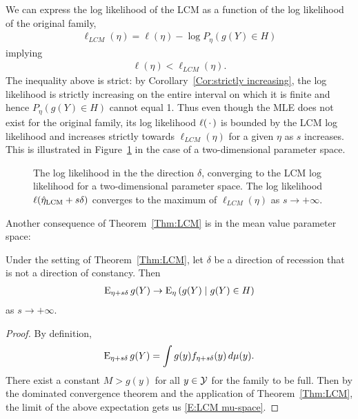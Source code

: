 We can express the log likelihood of the LCM as a function of the 
log likelihood of the original family,
\begin{align} \label{E:LCM ll bound}
 \ell_{LCM}(\eta) = \ell(\eta) - \log P_\eta(g(Y) \in H)
\end{align}
implying
\begin{align*}
	\ell(\eta) < \ell_{LCM}(\eta).	
\end{align*}
The inequality above is strict: by Corollary~\ref{Cor:strictly increasing}, the 
log likelihood is strictly increasing on the entire interval on which it is finite
and hence $P_\eta(g(Y) \in H)$ cannot equal 1.
Thus even though the MLE does not exist for the original family, its log likelihood
$\ell(\,\cdot\,)$ is bounded by the LCM log likelihood and increases strictly
towards $\ell_{LCM}(\eta)$ for a given $\eta$ as $s$ increases.
This is illustrated in Figure~\ref{F:LCM} in the case of a two-dimensional parameter
space.


\begin{figure}[h]
\centering
    \scalebox{.55}{}
	\caption[Log likelihood convergence to LCM]{The log likelihood in the
	the direction $\delta$, converging to the LCM log likelihood for a two-dimensional parameter space.  The log likelihood $\ell(\hat{\eta}_{\textrm{LCM}} + s\delta)$
	converges to the maximum of $\ell_{LCM}(\eta)$ as $s \to +\infty$.}
\label{F:LCM}
\end{figure}


Another consequence of Theorem~\ref{Thm:LCM} is in the mean value parameter space:
\begin{corollary} \label{Cor:LCM mu-space}
Under the setting of Theorem~\ref{Thm:LCM}, let $\delta$ be a direction of 
recession that is not a direction of constancy.  Then
\begin{align} \label{E:LCM mu-space}
	\operatorname{E}_{\eta+ s\delta} g(Y) \to \operatorname{E}_\eta \left ( g(Y) \mid g(Y) \in H  \right )
\end{align}
as $s \to +\infty$.
\end{corollary}
\begin{proof}
By definition,
\begin{align*}
	\operatorname{E}_{\eta+ s\delta} g(Y) = \int g(y) f_{\eta+ s\delta}(y) \, d\mu(y).
\end{align*}
There exist a constant $M > g(y)$ for all $y \in {\mathcal Y}$ for the family to
be full.  Then
by the dominated convergence theorem and the application of Theorem~\ref{Thm:LCM}, 
the limit of the above expectation gets us \eqref{E:LCM mu-space}.
\end{proof}

